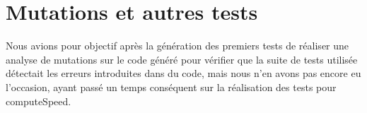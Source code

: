 \chapter{Mutations et autres tests}
\label{chap:mutations}



Nous avions pour objectif après la génération des premiers tests de réaliser une analyse de mutations sur le code généré pour vérifier que la suite de tests utilisée détectait les erreurs introduites dans du code, mais nous n'en avons pas encore eu l'occasion, ayant passé un temps conséquent sur la réalisation des tests pour computeSpeed.
